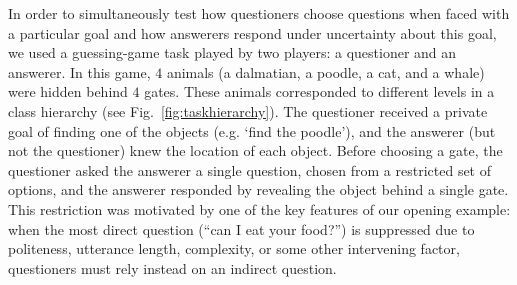 \documentclass[12pt, floatsintext, jou]{apa6}
\begin{document}
In order to simultaneously test how questioners choose questions when faced with a particular goal and how answerers respond  under uncertainty about this goal, we used a guessing-game task played by two players: a questioner and an answerer. In this game, $4$ animals (a dalmatian, a poodle, a cat, and a whale) were hidden behind $4$ gates. These animals corresponded to different levels in a class hierarchy (see Fig.~\ref{fig:taskhierarchy}). The questioner received a private goal of finding one of the objects (e.g. `find the poodle'), and the answerer (but not the questioner) knew the location of each object. Before choosing a gate, the questioner asked the answerer a single question, chosen from a restricted set of options, and the answerer responded by revealing the object behind a single gate. This restriction was motivated by one of the key features of our opening example: when the most direct question (``can I eat your food?'') is suppressed due to politeness, utterance length, complexity, or some other intervening factor, questioners must rely instead on an indirect question. 
\end{document}
